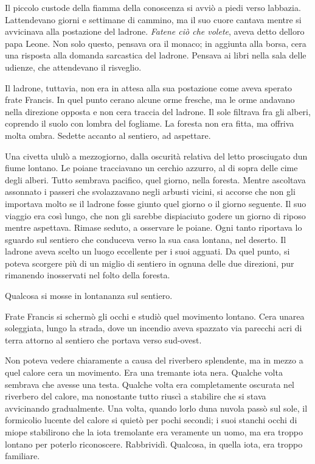 Il piccolo custode della fiamma della conoscenza si avviò a piedi verso
l\textquotesingle abbazia. L\textquotesingle attendevano giorni e
settimane di cammino, ma il suo cuore cantava mentre si avvicinava alla
postazione del ladrone. \emph{Fatene ciò che volete}, aveva detto
dell\textquotesingle oro papa Leone. Non solo questo, pensava ora il
monaco; in aggiunta alla borsa, c\textquotesingle era una risposta alla
domanda sarcastica del ladrone. Pensava ai libri nella sala delle
udienze, che attendevano il risveglio.

Il ladrone, tuttavia, non era in attesa alla sua postazione come aveva
sperato frate Francis. In quel punto c\textquotesingle erano alcune orme
fresche, ma le orme andavano nella direzione opposta e non
c\textquotesingle era traccia del ladrone. Il sole filtrava fra gli
alberi, coprendo il suolo con l\textquotesingle ombra del fogliame. La
foresta non era fitta, ma offriva molta ombra. Sedette accanto al
sentiero, ad aspettare.

Una civetta ululò a mezzogiorno, dalla oscurità relativa del letto
prosciugato d\textquotesingle un fiume lontano. Le poiane tracciavano un
cerchio azzurro, al di sopra delle cime degli alberi. Tutto sembrava
pacifico, quel giorno, nella foresta. Mentre ascoltava assonnato i
passeri che svolazzavano negli arbusti vicini, si accorse che non gli
importava molto se il ladrone fosse giunto quel giorno o il giorno
seguente. Il suo viaggio era così lungo, che non gli sarebbe dispiaciuto
godere un giorno di riposo mentre aspettava. Rimase seduto, a osservare
le poiane. Ogni tanto riportava lo sguardo sul sentiero che conduceva
verso la sua casa lontana, nel deserto. Il ladrone aveva scelto un luogo
eccellente per i suoi agguati. Da quel punto, si poteva scorgere più di
un miglio di sentiero in ognuna delle due direzioni, pur rimanendo
inosservati nel folto della foresta.

Qualcosa si mosse in lontananza sul sentiero.

Frate Francis si schermò gli occhi e studiò quel movimento lontano.
C\textquotesingle era un\textquotesingle area soleggiata, lungo la
strada, dove un incendio aveva spazzato via parecchi acri di terra
attorno al sentiero che portava verso sud-ovest.

Non poteva vedere chiaramente a causa del riverbero splendente, ma in
mezzo a quel calore c\textquotesingle era un movimento. Era una tremante
iota nera. Qualche volta sembrava che avesse una testa. Qualche volta
era completamente oscurata nel riverbero del calore, ma nonostante tutto
riuscì a stabilire che si stava avvicinando gradualmente. Una volta,
quando l\textquotesingle orlo d\textquotesingle una nuvola passò sul
sole, il formicolio lucente del calore si quietò per pochi secondi; i
suoi stanchi occhi di miope stabilirono che la iota tremolante era
veramente un uomo, ma era troppo lontano per poterlo riconoscere.
Rabbrividì. Qualcosa, in quella iota, era troppo familiare.

